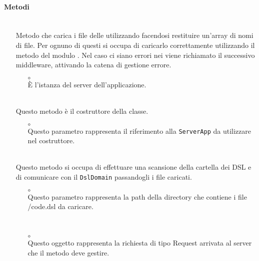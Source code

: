 \paragraph*{Metodi}
\begin{itemize}
\item[]  \\ Metodo che carica i file  delle  utilizzando  facendosi restituire un'array di nomi di file. Per ognuno di questi si occupa di caricarlo correttamente utilizzando il metodo  del modulo . Nel caso ci siano errori nei  viene richiamato il successivo middleware, attivando la catena di gestione errore.
\begin{itemize}\addtolength{\itemsep}{-0.5\baselineskip}
\item[$\circ$]  \\ È l'istanza del server dell'applicazione.
\end{itemize}
\item[]  \\ Questo metodo è il costruttore della classe.
\begin{itemize}\addtolength{\itemsep}{-0.5\baselineskip}
\item[$\circ$]  \\ Questo parametro rappresenta il riferimento alla \texttt{ServerApp} da utilizzare nel costruttore.
\end{itemize}
\item[]  \\ Questo metodo si occupa di effettuare una scansione della cartella dei DSL e di comunicare con il \texttt{DslDomain} passandogli i file caricati.
\begin{itemize}\addtolength{\itemsep}{-0.5\baselineskip}
\item[$\circ$]  \\ Questo parametro rappresenta la path della directory che contiene i file /code{.dsl} da caricare.
\end{itemize}
\item[]  \\ 
\begin{itemize}\addtolength{\itemsep}{-0.5\baselineskip}
\item[$\circ$]  \\ Questo oggetto rappresenta la richiesta di tipo Request arrivata al server che il metodo deve gestire.

\end{itemize}
\end{itemize}
